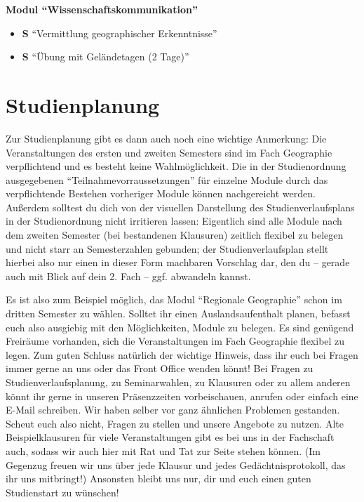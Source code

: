 \textbf{Modul "`Wissenschaftskommunikation"'}
\begin{itemize}
	\item \textbf{S} "`Vermittlung geographischer Erkenntnisse"' 
	\item \textbf{S} "`Übung mit Geländetagen (2 Tage)"' 
\end{itemize}

\section*{Studienplanung}
Zur Studienplanung gibt es dann auch noch eine wichtige Anmerkung:
Die Veranstaltungen des ersten und zweiten Semesters sind im Fach Geographie verpflichtend und es besteht keine Wahlmöglichkeit. Die in der Studienordnung ausgegebenen "`Teilnahmevorraussetzungen"' für einzelne Module durch das verpflichtende Bestehen vorheriger Module können nachgereicht werden. Außerdem solltest du dich von der visuellen Darstellung des Studienverlaufsplans in der Studienordnung nicht irritieren lassen: Eigentlich sind alle Module nach dem zweiten Semester (bei bestandenen Klausuren) zeitlich flexibel zu belegen und nicht starr an Semesterzahlen gebunden; der Studienverlaufsplan stellt hierbei also nur einen in dieser Form machbaren Vorschlag dar, den du -- gerade auch mit Blick auf dein 2. Fach -- ggf. abwandeln kannst.

Es ist also zum Beispiel möglich, das Modul \enquote{Regionale Geographie} schon im dritten Semester zu wählen. Solltet ihr einen Auslandsaufenthalt planen, befasst euch also ausgiebig mit den Möglichkeiten, Module zu belegen. Es sind genügend Freiräume vorhanden, sich die Veranstaltungen im Fach Geographie flexibel zu legen. Zum guten Schluss natürlich der wichtige Hinweis, dass ihr euch bei Fragen immer gerne an uns oder das Front Office wenden könnt! Bei Fragen zu Studienverlaufsplanung, zu Seminarwahlen, zu Klausuren oder zu allem anderen könnt ihr gerne in unseren Präsenzzeiten vorbeischauen, anrufen oder einfach eine E-Mail schreiben. Wir haben selber vor ganz ähnlichen Problemen gestanden. Scheut euch also nicht, Fragen zu stellen und unsere Angebote zu nutzen. Alte Beispielklausuren für viele Veranstaltungen gibt es bei uns in der Fachschaft auch, sodass wir auch hier mit Rat und Tat zur Seite stehen können. (Im Gegenzug freuen wir uns über jede Klausur und jedes Gedächtnisprotokoll, das ihr uns mitbringt!) Ansonsten bleibt uns nur, dir und euch einen guten Studienstart zu wünschen!
